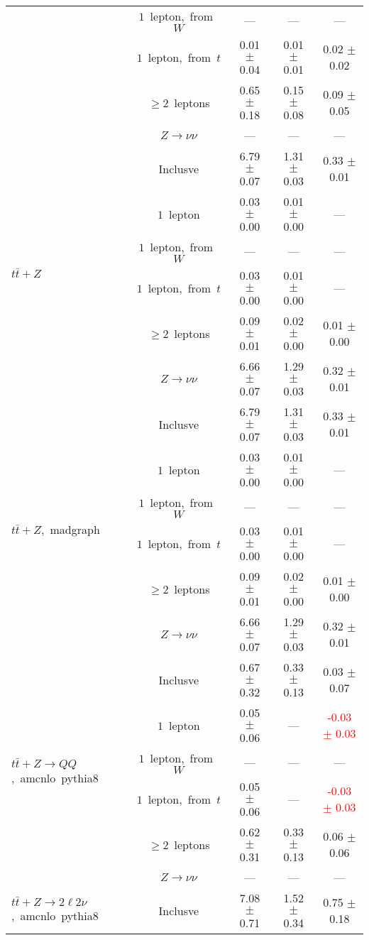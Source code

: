 \documentclass{article}
\begin{document}
\begin{longtable}{|l|c|c|c|c|}
 & $1$~lepton,~from~$W$  & ---  & ---  & --- \\* 
 & $1$~lepton,~from~$t$  & 0.01 $\pm$ 0.04  & 0.01 $\pm$ 0.01  & 0.02 $\pm$ 0.02 \\* 
 & $\ge2$~leptons  & 0.65 $\pm$ 0.18  & 0.15 $\pm$ 0.08  & 0.09 $\pm$ 0.05 \\* 
 & $Z\rightarrow\nu\nu$  & ---  & ---  & --- \\* 
\hline 
\multirow{6}{*}{$t\bar{t}+Z$} & Inclusve  & 6.79 $\pm$ 0.07  & 1.31 $\pm$ 0.03  & 0.33 $\pm$ 0.01 \\* 
 & $1$~lepton  & 0.03 $\pm$ 0.00  & 0.01 $\pm$ 0.00  & --- \\* 
 & $1$~lepton,~from~$W$  & ---  & ---  & --- \\* 
 & $1$~lepton,~from~$t$  & 0.03 $\pm$ 0.00  & 0.01 $\pm$ 0.00  & --- \\* 
 & $\ge2$~leptons  & 0.09 $\pm$ 0.01  & 0.02 $\pm$ 0.00  & 0.01 $\pm$ 0.00 \\* 
 & $Z\rightarrow\nu\nu$  & 6.66 $\pm$ 0.07  & 1.29 $\pm$ 0.03  & 0.32 $\pm$ 0.01 \\* 
\hline 
\multirow{6}{*}{$t\bar{t}+Z$,~madgraph} & Inclusve  & 6.79 $\pm$ 0.07  & 1.31 $\pm$ 0.03  & 0.33 $\pm$ 0.01 \\* 
 & $1$~lepton  & 0.03 $\pm$ 0.00  & 0.01 $\pm$ 0.00  & --- \\* 
 & $1$~lepton,~from~$W$  & ---  & ---  & --- \\* 
 & $1$~lepton,~from~$t$  & 0.03 $\pm$ 0.00  & 0.01 $\pm$ 0.00  & --- \\* 
 & $\ge2$~leptons  & 0.09 $\pm$ 0.01  & 0.02 $\pm$ 0.00  & 0.01 $\pm$ 0.00 \\* 
 & $Z\rightarrow\nu\nu$  & 6.66 $\pm$ 0.07  & 1.29 $\pm$ 0.03  & 0.32 $\pm$ 0.01 \\* 
\hline 
\multirow{6}{*}{$t\bar{t}+Z{\rightarrow}QQ$,~amcnlo~pythia8} & Inclusve  & 0.67 $\pm$ 0.32  & 0.33 $\pm$ 0.13  & 0.03 $\pm$ 0.07 \\* 
 & $1$~lepton  & 0.05 $\pm$ 0.06  & ---  & \textcolor{red}{ -0.03 $\pm$ 0.03 } \\* 
 & $1$~lepton,~from~$W$  & ---  & ---  & --- \\* 
 & $1$~lepton,~from~$t$  & 0.05 $\pm$ 0.06  & ---  & \textcolor{red}{ -0.03 $\pm$ 0.03 } \\* 
 & $\ge2$~leptons  & 0.62 $\pm$ 0.31  & 0.33 $\pm$ 0.13  & 0.06 $\pm$ 0.06 \\* 
 & $Z\rightarrow\nu\nu$  & ---  & ---  & --- \\* 
\hline 
\multirow{6}{*}{$t\bar{t}+Z{\rightarrow}2{\ell}2{\nu}$,~amcnlo~pythia8} & Inclusve  & 7.08 $\pm$ 0.71  & 1.52 $\pm$ 0.34  & 0.75 $\pm$ 0.18 \\* 

\end{longtable}
\end{document}
